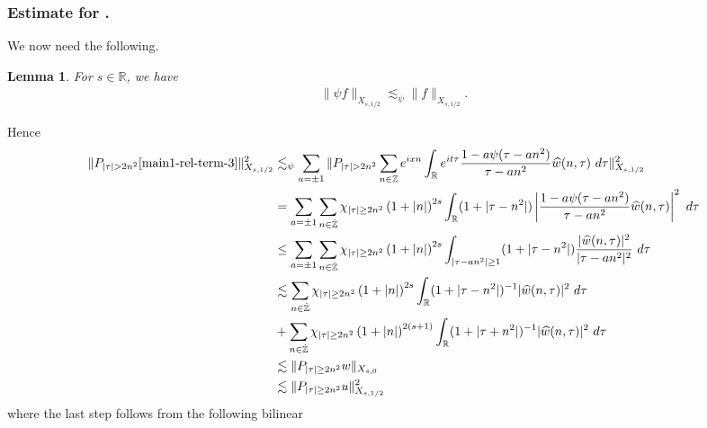\documentclass[12pt,reqno]{amsart}
\numberwithin{equation}{section}  %
\renewcommand{\cref}{\Cref}
\newcommand{\rr}{\mathbb{R}}
\newcommand{\zz}{\mathbb{Z}}
\newcommand{\zzdot}{\dot{\zz}}
\newcommand{\wh}{\widehat}
\newtheorem{lemma}[theorem]{Lemma}
\begin{document}
\subsubsection{Estimate for \cref{main1-rel-term-3}.}
%
%
%
%
%
%
%
%
%
We now need the following.
%
\begin{lemma}
\label{lem:schwartz-mult}
For $s\in \rr$, we have
%
%
\begin{equation}
	\label{schwartz-mult}
	\begin{split}
    \|\psi f \|_{X_{s,1/2}} \lesssim_{\psi} \|f \|_{X_{s,1/2}}.
	\end{split}
\end{equation}
%
%
\end{lemma}
%
Hence
%
%
\begin{equation}
  \label{yu}
	\begin{split}
		\|P_{| \tau | > 2n^{2}}\cref{main1-rel-term-3}\|_{X_{s,1/2}}^{2} 
    & \lesssim_{\psi} 
    \sum_{a = \pm 1} \| P_{| \tau | > 2n^{2}}\sum_{n \in \zz}  e^{ixn} \int_\rr 
		e^{it \tau} \frac{1 - a\psi (\tau - an^{2} ) 
}{\tau - an^{2}} \wh{w}(n, \tau) \ 
		d \tau\|_{X_{s,1/2}}^{2}
		\\
    & = \sum_{a = \pm 1}\sum_{n \in \zzdot} \chi_{| \tau | \ge 2n^{2}}\left (1 + |n| \right )^{2s} \int_\rr
    (1 + |  \tau - n^{2}|) \left | \frac{1 - a\psi(\tau - an^{2 
})}{\tau - an^{2}} 
     \wh{w}(n, \tau) \right |^2 \ d 
		\tau 
		\\
    & \le \sum_{a = \pm 1}
    \sum_{n \in \zzdot} \chi_{| \tau | \ge 2n^{2}} \left (1 + |n| \right )^{2s} \int_{| \tau - an^{2}| \ge 1}
    (1 + | \tau - n^{2}|) \frac{|  \wh{w}(n, \tau)|^2}{|\tau - an^{2}|^2} 
		\ d 
		\tau 
		\\
		  & \lesssim 
 \sum_{n \in 
		\zzdot} \chi_{| \tau | \ge 2n^{2}} \left (1 + |n| \right )^{2s} \int_\rr (1 +  | \tau - n^{2}|)^{-1} | \wh{w}(n, \tau) |^2 
		 \ d \tau 
		 \\
		 & +  \sum_{n \in 
		\zzdot} \chi_{| \tau | \ge 2n^{2}} \left (1 + |n| \right )^{2(s+1)} \int_\rr (1 +  | \tau + n^{2}|)^{-1} | \wh{w}(n, \tau) |^2 
		 \ d \tau 
		\\
		& \lesssim \| P_{| \tau | \ge 2n^{2}}w \|_{X_{s,0}}
		\\
		& \lesssim \| P_{| \tau | \ge 2n^{2}}u \|^{2}_{X_{s,1/2}}
\end{split}
\end{equation}
%
%
%
where the last step follows from the following bilinear
\end{document}
